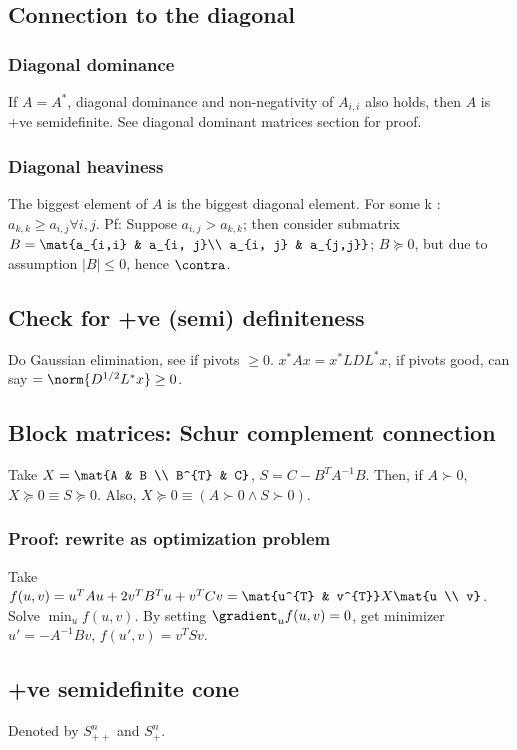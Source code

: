 \documentclass[oneside, article]{memoir}
\begin{document}
\subsection{Connection to the diagonal}
\subsubsection{Diagonal dominance}
If $A = A^{*}$, diagonal dominance and non-negativity of $A_{i,i}$ also holds, then $A$ is +ve semidefinite. See diagonal dominant matrices section for proof.

\subsubsection{Diagonal heaviness}
The biggest element of $A$ is the biggest diagonal element. For some k : $a_{k,k} \geq a_{i,j} \forall i,j$. Pf: Suppose $a_{i,j} > a_{k,k}$; then consider submatrix $B = \mat{a_{i,i} & a_{i, j}\\ a_{i, j} & a_{j,j}}$; $B \succeq 0$, but due to assumption $|B| \leq 0$, hence $\contra$.

\subsection{Check for +ve (semi) definiteness}
Do Gaussian elimination, see if pivots $\geq 0$. $x^{*}Ax = x^{*}LDL^{*}x$, if pivots good, can say $= \norm{D^{1/2}L^{*}x} \geq 0$.

\subsection{Block matrices: Schur complement connection}
Take $X = \mat{A & B \\ B^{T} & C}$, $S  = C - B^{T}A^{-1}B$. Then, if $A \succ 0$, $X \succeq 0 \equiv S \succeq 0$. Also, $X \succeq 0 \equiv (A \succ 0 \land S \succ 0)$.

\subsubsection{Proof: rewrite as optimization problem}
Take $f(u, v) = u^{T}Au + 2v^{T}B^{T}u + v^{T}Cv = \mat{u^{T} & v^{T}}X \mat{u \\ v}$. Solve $\min_u f(u, v)$. By setting $\gradient_u f(u, v) = 0$, get minimizer $u' = -A^{-1}Bv$, $f(u', v) = v^{T}Sv$.

\subsection{+ve semidefinite cone}
Denoted by $S_{++}^{n}$ and $S_{+}^{n}$.
\end{document}
